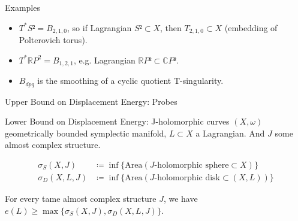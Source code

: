 \documentclass[handout,aspectratio=169]{beamer}
\begin{document}
\begin{frame}{Examples}
  \begin{itemize}
    \item<1-> $T^* S² = B_{2,1,0}$, so if Lagrangian $S² ⊂ X$, then $T_{2,1,0} ⊂ X$ (embedding of Polterovich torus).
    \item<2-> $T^* ℝP^2 = B_{1,2,1}$, e.g. Lagrangian $ℝP² ⊂ ℂP²$.
    \item<3-> $B_{dpq}$ is the smoothing of a cyclic quotient T-singularity.
  \end{itemize}
\end{frame}

\begin{frame}{Upper Bound on Displacement Energy: Probes}
  \begin{center}

  \end{center}
\end{frame}

\begin{frame}{Lower Bound on Displacement Energy: J-holomorphic curves}
  $(X,ω)$ geometrically bounded symplectic manifold, $L ⊂ X$ a Lagrangian. And $J$ some almost complex structure.
  \begin{definition}
    \begin{align*}
      σ_S(X,J) &≔ \inf\{\text{Area}(J\text{-holomorphic sphere} ⊂ X)\}\\
      σ_D(X,L,J) &≔ \inf\{\text{Area}(J\text{-holomorphic disk} ⊂ (X,L))\}
    \end{align*}
  \end{definition}

  \pause
  \begin{theorem}[Chekanov]
    For every tame almost complex structure $J$, we have $e(L) ≥ \max\{σ_S(X,J), σ_D(X,L,J)\}$.
  \end{theorem}
\end{frame}
\end{document}

